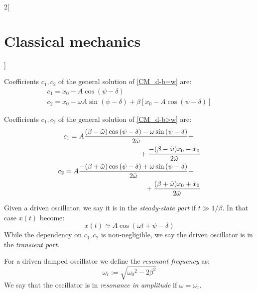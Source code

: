\documentclass[../../../main.tex]{subfiles}
\begin{document}
\begin{multicols}{2}[\section{Classical mechanics}]
\begin{proposition}
  \end{proposition}
  \begin{proposition}
    Coefficients $c_1,c_2$ of the general solution of \cref{CM_d-b=w} are:
    \begin{gather*}
      c_1=x_0-A\cos\left(\psi-\delta\right)\\
      c_2=\dot{x}_0-\omega A\sin\left(\psi-\delta\right)+\beta\left[x_0-A\cos\left(\psi-\delta\right)\right]
    \end{gather*}
  \end{proposition}
  \begin{proposition}
    Coefficients $c_1,c_2$ of the general solution of \cref{CM_d-b>w} are:
    \begin{equation*}
      \begin{split}
        \begin{multlined}[t]
          c_1=A\frac{(\beta-\Tilde{\omega})\cos\left(\psi-\delta\right)-\omega\sin\left(\psi-\delta\right)}{2\Tilde{\omega}}+\\+\frac{-(\beta-\Tilde{\omega})x_0-\dot{x}_0}{2\Tilde{\omega}}
        \end{multlined}\\
        \begin{multlined}[t]
          c_2=A\frac{-(\beta+\Tilde{\omega})\cos\left(\psi-\delta\right)+\omega\sin\left(\psi-\delta\right)}{2\Tilde{\omega}}+\\+\frac{(\beta+\Tilde{\omega})x_0+\dot{x}_0}{2\Tilde{\omega}}
        \end{multlined}
      \end{split}
    \end{equation*}
  \end{proposition}
  \begin{definition}
    Given a driven oscillator, we say it is in the \emph{steady-state part} if $t\gg 1/\beta$. In that case $x(t)$ become: $$x(t)\simeq A\cos(\omega t+\psi-\delta)$$ While the dependency on $c_1,c_2$ is non-negligible, we say the driven oscillator is in the \emph{transient part}.
  \end{definition}
  \begin{definition}
    For a driven damped oscillator we define the \emph{resonant frequency} as: $$\omega_\text{r}:=\sqrt{{\omega_0}^2-2\beta^2}$$ We say that the oscillator is in \emph{resonance in amplitude} if $\omega=\omega_\text{r}$.
  \end{definition}
  \begin{proposition}

\end{proposition}
\end{multicols}
\end{document}
